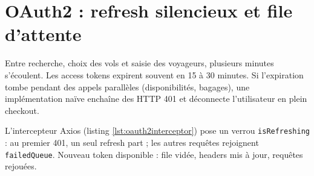 \section{OAuth2 : refresh silencieux et file d'attente}

Entre recherche, choix des vols et saisie des voyageurs, plusieurs minutes s'écoulent. Les access tokens expirent souvent en 15 à 30 minutes. Si l'expiration tombe pendant des appels parallèles (disponibilités, bagages), une implémentation naïve enchaîne des HTTP 401 et déconnecte l'utilisateur en plein checkout.

L'intercepteur Axios (listing \ref{lst:oauth2interceptor}) pose un verrou \texttt{isRefreshing} : au premier 401, un seul refresh part ; les autres requêtes rejoignent \texttt{failedQueue}. Nouveau token disponible : file vidée, headers mis à jour, requêtes rejouées.

